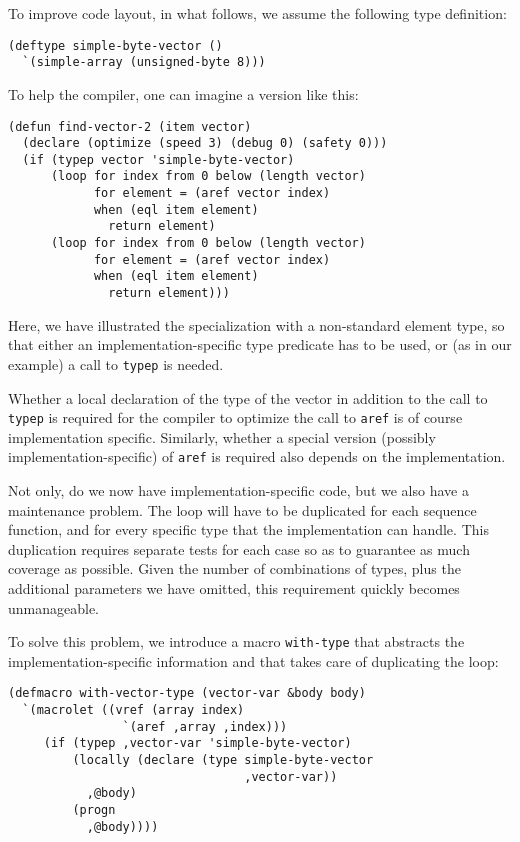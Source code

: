 To improve code layout, in what follows, we assume the following type
definition:

{\small\begin{verbatim}
(deftype simple-byte-vector ()
  `(simple-array (unsigned-byte 8)))
\end{verbatim}}

To help the compiler, one can imagine a version like this:

{\small\begin{verbatim}
(defun find-vector-2 (item vector)
  (declare (optimize (speed 3) (debug 0) (safety 0)))
  (if (typep vector 'simple-byte-vector)
      (loop for index from 0 below (length vector)
            for element = (aref vector index)
            when (eql item element)
              return element)
      (loop for index from 0 below (length vector)
            for element = (aref vector index)
            when (eql item element)
              return element)))
\end{verbatim}}

Here, we have illustrated the specialization with a non-standard
element type, so that either an implementation-specific type predicate
has to be used, or (as in our example) a call to \texttt{typep} is
needed.

Whether a local declaration of the type of the vector in addition to
the call to \texttt{typep} is required for the compiler to optimize
the call to \texttt{aref} is of course implementation specific.
Similarly, whether a special version (possibly
implementation-specific) of \texttt{aref} is required also depends on
the implementation.

Not only, do we now have implementation-specific code, but we also
have a maintenance problem.  The loop will have to be duplicated for
each sequence function, and for every specific type that the
implementation can handle.  This duplication requires separate tests
for each case so as to guarantee as much coverage as possible.  Given
the number of combinations of types, plus the additional parameters we
have omitted, this requirement quickly becomes unmanageable.

To solve this problem, we introduce a macro \texttt{with-type} that
abstracts the implementation-specific information and that takes care
of duplicating the loop:

{\small\begin{verbatim}
(defmacro with-vector-type (vector-var &body body)
  `(macrolet ((vref (array index)
                `(aref ,array ,index)))
     (if (typep ,vector-var 'simple-byte-vector)
         (locally (declare (type simple-byte-vector
                                 ,vector-var))
           ,@body)
         (progn
           ,@body))))
\end{verbatim}}

